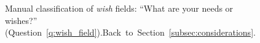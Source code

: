 \begin{figure}[h!]
    \caption[Manual classification of \textit{wish} fields]{Manual classification of \textit{wish} fields: ``What are your needs or wishes?'' (Question~\ref{q:wish_field}).\hfill Back~to~Section~\ref{subsec:considerations}.
    }\label{fig:wish_field}
\end{figure}

